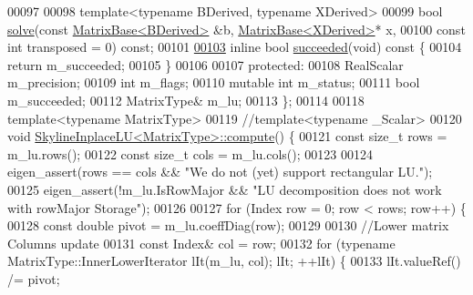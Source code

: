 \begin{DoxyCode}
00097 
00098     \textcolor{keyword}{template}<\textcolor{keyword}{typename} BDerived, \textcolor{keyword}{typename} XDerived>
00099     \textcolor{keywordtype}{bool} \hyperlink{class_eigen_1_1_skyline_inplace_l_u_a53c846d76559221d2bcf336a2da4d68f}{solve}(\textcolor{keyword}{const} \hyperlink{group___core___module_class_eigen_1_1_matrix_base}{MatrixBase<BDerived>} &b, 
      \hyperlink{group___core___module_class_eigen_1_1_matrix_base}{MatrixBase<XDerived>}* x,
00100             \textcolor{keyword}{const} \textcolor{keywordtype}{int} transposed = 0) \textcolor{keyword}{const};
00101 
\hyperlink{class_eigen_1_1_skyline_inplace_l_u_abd633c27a0a342fb392b6af3ceb800ba}{00103}     \textcolor{keyword}{inline} \textcolor{keywordtype}{bool} \hyperlink{class_eigen_1_1_skyline_inplace_l_u_abd633c27a0a342fb392b6af3ceb800ba}{succeeded}(\textcolor{keywordtype}{void})\textcolor{keyword}{ const }\{
00104         \textcolor{keywordflow}{return} m\_succeeded;
00105     \}
00106 
00107 \textcolor{keyword}{protected}:
00108     RealScalar m\_precision;
00109     \textcolor{keywordtype}{int} m\_flags;
00110     \textcolor{keyword}{mutable} \textcolor{keywordtype}{int} m\_status;
00111     \textcolor{keywordtype}{bool} m\_succeeded;
00112     MatrixType& m\_lu;
00113 \};
00114 
00118 \textcolor{keyword}{template}<\textcolor{keyword}{typename} MatrixType>
00119 \textcolor{comment}{//template<typename \_Scalar>}
00120 \textcolor{keywordtype}{void} \hyperlink{class_eigen_1_1_skyline_inplace_l_u_a590e9a988b2843712a29a541787e6c38}{SkylineInplaceLU<MatrixType>::compute}() \{
00121     \textcolor{keyword}{const} \textcolor{keywordtype}{size\_t} rows = m\_lu.rows();
00122     \textcolor{keyword}{const} \textcolor{keywordtype}{size\_t} cols = m\_lu.cols();
00123 
00124     eigen\_assert(rows == cols && \textcolor{stringliteral}{"We do not (yet) support rectangular LU."});
00125     eigen\_assert(!m\_lu.IsRowMajor && \textcolor{stringliteral}{"LU decomposition does not work with rowMajor Storage"});
00126 
00127     \textcolor{keywordflow}{for} (Index row = 0; row < rows; row++) \{
00128         \textcolor{keyword}{const} \textcolor{keywordtype}{double} pivot = m\_lu.coeffDiag(row);
00129 
00130         \textcolor{comment}{//Lower matrix Columns update}
00131         \textcolor{keyword}{const} Index& col = row;
00132         \textcolor{keywordflow}{for} (\textcolor{keyword}{typename} MatrixType::InnerLowerIterator lIt(m\_lu, col); lIt; ++lIt) \{
00133             lIt.valueRef() /= pivot;

\end{DoxyCode}
